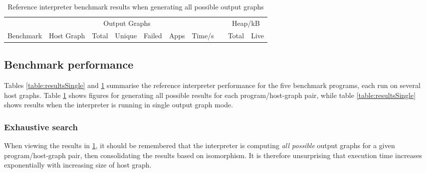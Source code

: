 \begin{table}[h]
\begin{minipage}{\textwidth}
\centering

\begin{tabular}{llrrrrrcrr}
\hline 
&  & \multicolumn{3}{c}{Output Graphs} & & && \multicolumn{2}{c}{Heap/kB}\\
Benchmark          & Host Graph\footnotemark & Total & Unique   & Failed & Apps & Time/s   & & Total  & Live \\
\hline 

\end{tabular}

\caption[Reference interpreter benchmarks]{Reference interpreter benchmark results when generating all possible output graphs}

\label{table:resultsAll}
\end{minipage}
\end{table}


\subsection{Benchmark performance}

Tables \ref{table:resultsSingle} and \ref{table:resultsAll} summarise the reference interpreter performance for the five benchmark programs, each run on several host graphs. Table \ref{table:resultsAll} shows figures for generating all possible results for each program/host-graph pair, while table \ref{table:resultsSingle} shows results when the interpreter is running in single output graph mode.





\subsubsection*{Exhaustive search}

When viewing the results in \ref{table:resultsAll}, it should be remembered that the interpreter is computing \textit{all possible} output graphs for a given program/host-graph pair, then consolidating the results based on isomorphism. It is therefore unsurprising that execution time increases exponentially with increasing size of host graph.


